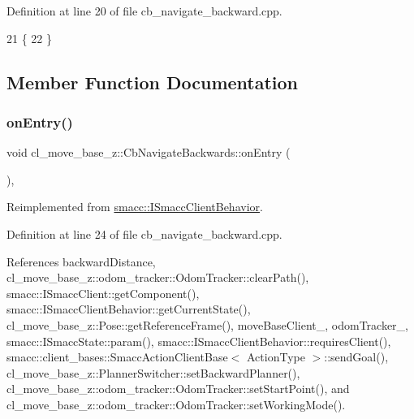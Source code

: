 Definition at line 20 of file cb\+\_\+navigate\+\_\+backward.\+cpp.


\begin{DoxyCode}
21     \{
22     \}
\end{DoxyCode}


\subsection{Member Function Documentation}
\mbox{\label{classcl__move__base__z_1_1CbNavigateBackwards_a545a5282f0ef6b0080b46002d6037567}} 
\subsubsection{\texorpdfstring{on\+Entry()}{onEntry()}}
{\footnotesize\ttfamily void cl\+\_\+move\+\_\+base\+\_\+z\+::\+Cb\+Navigate\+Backwards\+::on\+Entry (\begin{DoxyParamCaption}{ }\end{DoxyParamCaption})\hspace{0.3cm}{\ttfamily [override]}, {\ttfamily [virtual]}}



Reimplemented from \hyperlink{classsmacc_1_1ISmaccClientBehavior_a3ec24a839087c550e1d62a81e48cf530}{smacc\+::\+I\+Smacc\+Client\+Behavior}.



Definition at line 24 of file cb\+\_\+navigate\+\_\+backward.\+cpp.



References backward\+Distance, cl\+\_\+move\+\_\+base\+\_\+z\+::odom\+\_\+tracker\+::\+Odom\+Tracker\+::clear\+Path(), smacc\+::\+I\+Smacc\+Client\+::get\+Component(), smacc\+::\+I\+Smacc\+Client\+Behavior\+::get\+Current\+State(), cl\+\_\+move\+\_\+base\+\_\+z\+::\+Pose\+::get\+Reference\+Frame(), move\+Base\+Client\+\_\+, odom\+Tracker\+\_\+, smacc\+::\+I\+Smacc\+State\+::param(), smacc\+::\+I\+Smacc\+Client\+Behavior\+::requires\+Client(), smacc\+::client\+\_\+bases\+::\+Smacc\+Action\+Client\+Base$<$ Action\+Type $>$\+::send\+Goal(), cl\+\_\+move\+\_\+base\+\_\+z\+::\+Planner\+Switcher\+::set\+Backward\+Planner(), cl\+\_\+move\+\_\+base\+\_\+z\+::odom\+\_\+tracker\+::\+Odom\+Tracker\+::set\+Start\+Point(), and cl\+\_\+move\+\_\+base\+\_\+z\+::odom\+\_\+tracker\+::\+Odom\+Tracker\+::set\+Working\+Mode().


